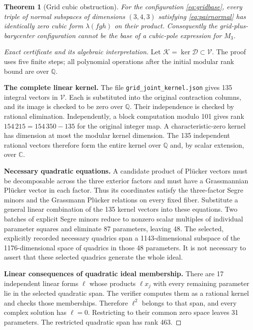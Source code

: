 \documentclass[11pt]{article}
\newtheorem{theorem}{Theorem}[section]
\theoremstyle{definition}\newtheorem{definition}[theorem]{Definition}
\theoremstyle{remark}\newtheorem{remark}[theorem]{Remark}
\newcommand{\C}{\mathbb C}
\newcommand{\Q}{\mathbb Q}
\begin{document}
\begin{theorem}[Grid cubic obstruction]\label{thm:grid}
For the configuration \eqref{eq:gridbase}, every triple of normal subspaces
of dimensions $(3,4,3)$ satisfying \eqref{eq:pairnormal} has identically zero
cubic form $\lambda(fgh)$ on their product. Consequently the grid-plus-
barycenter configuration cannot be the base of a cubic-pole expression
for $M_3$.
\end{theorem}
\begin{proof}[Exact certificate and its algebraic interpretation]
Let $\mathcal K=\ker\mathcal D\subset\mathcal V$.
The proof uses five finite steps; all polynomial operations after the
initial modular rank bound are over $\Q$.

\textbf{The complete linear kernel.}
The file \texttt{grid\_joint\_kernel.json} gives 135 integral vectors in
$\mathcal V$. Each is substituted into the original contraction columns,
and its image is checked to be zero over $\Q$. Their independence is checked
by rational elimination. Independently, a block computation modulo 101
gives rank $154\,215=154\,350-135$ for the original integer map. A
characteristic-zero kernel has dimension at most the modular kernel
dimension. The 135 independent rational vectors therefore form the entire
kernel over $\Q$ and, by scalar extension, over $\C$.

\textbf{Necessary quadratic equations.}
A candidate product of Pl\"ucker vectors must be decomposable across the three
exterior factors and must have a Grassmannian Pl\"ucker vector in each factor.
Thus its coordinates satisfy the three-factor Segre minors and the
Grassmann Pl\"ucker relations on every fixed fiber. Substitute a general
linear combination of the 135 kernel vectors into these equations.
Two batches of explicit Segre minors reduce to nonzero scalar multiples of
individual parameter squares and eliminate 87 parameters, leaving 48.
The selected, explicitly recorded necessary quadrics span a
1143-dimensional subspace of the 1176-dimensional space of quadrics in
those 48 parameters. It is not necessary to assert that these selected
quadrics generate the whole ideal.

\textbf{Linear consequences of quadratic ideal membership.}
There are 17 independent linear forms $\ell$ whose products $\ell x_j$ with
every remaining parameter lie in the selected quadratic span. The verifier
computes them as a rational kernel and checks those memberships. Therefore
$\ell^2$ belongs to that span, and every complex solution has $\ell=0$.
Restricting to their common zero space leaves 31 parameters. The restricted
quadratic span has rank 463.


\end{proof}
\end{document}
